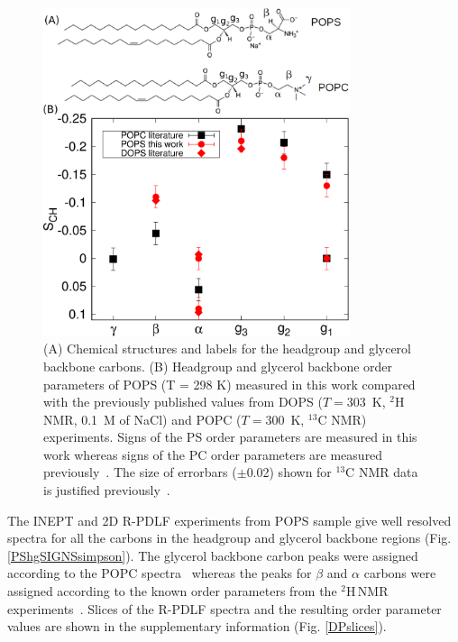 \documentclass[aps,prl,superscriptaddress,twocolumn]{revtex4}
\begin{document}
\begin{figure}[!htb]
  \centering
  \includegraphics[width=9.0cm]{../Figs/PCPScomp.eps}
  \caption{\label{HGorderParameters}
    (A) Chemical structures and labels for the headgroup and glycerol backbone carbons.
    (B) Headgroup and glycerol backbone order parameters of POPS (T = 298 K) measured in this work compared
    with the previously published values from DOPS ($T=303$~K, $^2$H NMR, 0.1~M of NaCl) \cite{browning80} and 
    POPC  ($T=300$~K, $^{13}$C NMR) \cite{ferreira13} experiments. Signs of the PS order parameters
    are measured in this work whereas signs of the PC order parameters are measured previously~\cite{ferreira16}.
    The size of errorbars ($\pm$0.02) shown for $^{13}$C NMR data is justified previously~\cite{botan15,ollila16}. 
  }
\end{figure}

The INEPT and 2D R-PDLF experiments from POPS sample give well resolved spectra for all the
carbons in the headgroup and glycerol backbone regions (Fig. \ref{PShgSIGNSsimpson}).
The glycerol backbone carbon peaks were assigned according to the POPC spectra~\cite{ferreira13} whereas
the peaks for $\beta$ and $\alpha$ carbons were assigned according to the
known order parameters from the $^2$H\,NMR experiments~\cite{browning80}.
Slices of the R-PDLF spectra and the resulting order parameter values
are shown in the supplementary information (Fig. \ref{DPslices}). 
\end{document}
